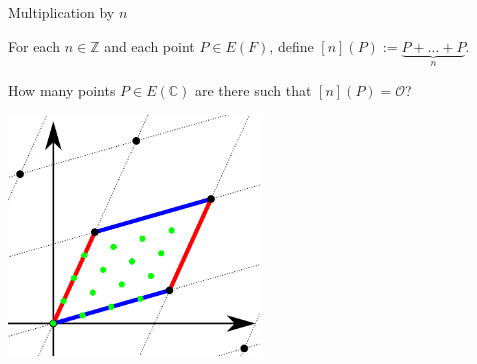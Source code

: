 \documentclass[10pt]{beamer}
\begin{document}
\begin{frame}[t]{Multiplication by $ n $}

For each $ n \in \mathbb{Z} $ and each point $ P \in E(F) $, define $ [n](P) := \underbrace{P + \dots + P}_n $.

\pause

\vspace{0.5cm} How many points $ P \in E(\mathbb{C}) $ are there such that $ [n](P) = \mathcal{O} $?

\begin{center}
\includegraphics[width=0.5\textwidth]{torsionsubgroup.png}
\end{center}

\end{frame}
\end{document}

